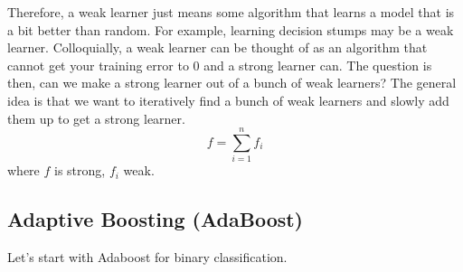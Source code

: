   Therefore, a weak learner just means some algorithm that learns a model that is a bit better than random. For example, learning decision stumps may be a weak learner. Colloquially, a weak learner can be thought of as an algorithm that cannot get your training error to $0$ and a strong learner can. The question is then, can we make a strong learner out of a bunch of weak learners? The general idea is that we want to iteratively find a bunch of weak learners and slowly add them up to get a strong learner. 
  \begin{equation}
    f = \sum_{i=1}^n f_i
  \end{equation}
  where $f$ is strong, $f_i$ weak. 

\subsection{Adaptive Boosting (AdaBoost)} 

  Let's start with Adaboost for binary classification. 

